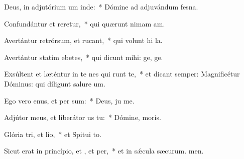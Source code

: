 \item Deus, in adjutórium um inde:~* Dómine ad adjuvándum  fesna.
\item Confundántur et reretur,~* qui quærunt nimam am.
\item Avertántur retrórsum, et rucant,~* qui volunt hi la.
\item Avertántur statim ebetes,~* qui dicunt mihi: ge, ge.
\item Exsúltent et læténtur in te nes qui runt te,~* et dicant semper: Magnificétur Dóminus: qui díligunt salure um.
\item Ego vero enus, et per sum:~* Deus, ju me.
\item Adjútor meus, et liberátor us  tu:~* Dómine,  moris.
\item Glória tri, et lio,~* et Spitui to.
\item Sicut erat in princípio, et , et per,~* et in sǽcula sæcurum. men.
